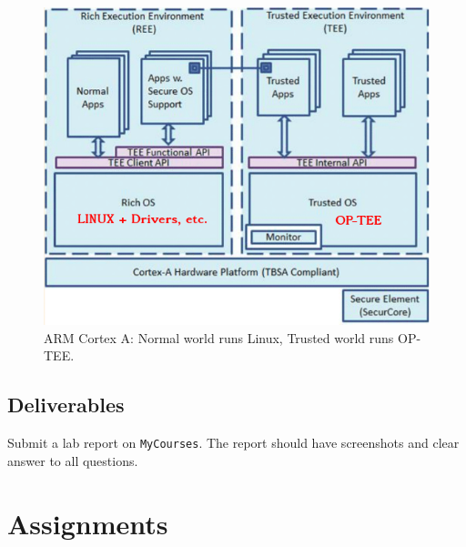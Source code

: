 \documentclass[10pt]{article}
\begin{document}
\begin{figure}[!hbtp]
\centering
\includegraphics[width=0.6\columnwidth]{TZ-OP-TEE.png}
 \caption{ARM Cortex A: Normal world runs Linux, Trusted world runs OP-TEE.}\label{fig:tz}
\end{figure}


\subsection{Deliverables}
Submit a lab report on \verb|MyCourses|. The report should have screenshots and clear answer to all questions.

\section{Assignments}
\end{document}
